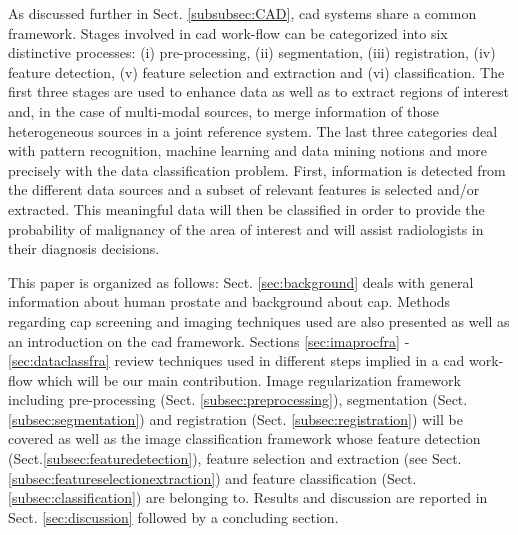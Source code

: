 As discussed further in Sect. \ref{subsubsec:CAD}, \acs{cad} systems share a common framework. Stages involved in \acs{cad} work-flow can be categorized into six distinctive processes: (i) pre-processing, (ii) segmentation, (iii) registration, (iv) feature detection, (v) feature selection and extraction and (vi) classification. The first three stages are used to enhance data as well as to extract regions of interest and, in the case of multi-modal sources, to merge information of those heterogeneous sources in a joint reference system. The last three categories deal with pattern recognition, machine learning and data mining notions and more precisely with the data classification problem. First, information is detected from the different data sources and a subset of relevant features is selected and/or extracted. This meaningful data will then be classified in order to provide the probability of malignancy of the area of interest and will assist radiologists in their diagnosis decisions.

This paper is organized as follows: Sect. \ref{sec:background} deals with general information about human prostate and background about \ac{cap}. Methods regarding \ac{cap} screening and imaging techniques used are also presented as well as an introduction on the \acs{cad} framework. Sections \ref{sec:imaprocfra} - \ref{sec:dataclassfra} review techniques used in different steps implied in a \acs{cad} work-flow which will be our main contribution. Image regularization framework including pre-processing (Sect. \ref{subsec:preprocessing}), segmentation (Sect. \ref{subsec:segmentation}) and registration (Sect. \ref{subsec:registration}) will be covered as well as the image classification framework whose feature detection (Sect.\ref{subsec:featuredetection}), feature selection and extraction (see Sect. \ref{subsec:featureselectionextraction}) and feature classification (Sect. \ref{subsec:classification}) are belonging to. Results and discussion are reported in Sect. \ref{sec:discussion} followed by a concluding section.
